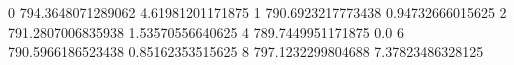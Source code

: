 0 794.3648071289062 4.61981201171875
1 790.6923217773438 0.94732666015625
2 791.2807006835938 1.53570556640625
4 789.7449951171875 0.0
6 790.5966186523438 0.85162353515625
8 797.1232299804688 7.37823486328125
